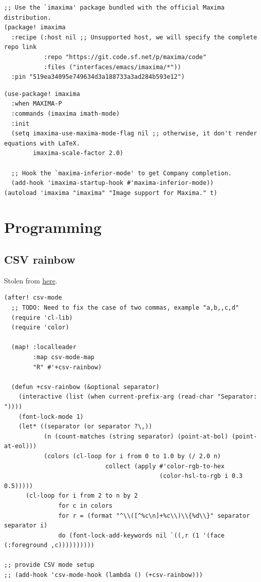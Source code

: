 \documentclass[11pt]{article}
\begin{document}
\begin{verbatim}
;; Use the `imaxima' package bundled with the official Maxima distribution.
(package! imaxima
  :recipe (:host nil ;; Unsupported host, we will specify the complete repo link
           :repo "https://git.code.sf.net/p/maxima/code"
           :files ("interfaces/emacs/imaxima/*"))
  :pin "519ea34095e749634d3a188733a3ad284b593e12")
\end{verbatim}

\begin{verbatim}
(use-package! imaxima
  :when MAXIMA-P
  :commands (imaxima imath-mode)
  :init
  (setq imaxima-use-maxima-mode-flag nil ;; otherwise, it don't render equations with LaTeX.
        imaxima-scale-factor 2.0)

  ;; Hook the `maxima-inferior-mode' to get Company completion.
  (add-hook 'imaxima-startup-hook #'maxima-inferior-mode))
(autoload 'imaxima "imaxima" "Image support for Maxima." t)
\end{verbatim}

\section{Programming}
\label{sec:orgfca1b92}
\subsection{CSV rainbow}
\label{sec:org81b9f4d}
Stolen from \href{https://www.reddit.com/r/emacs/comments/26c71k/comment/chq2r8m/?utm\_source=reddit\&utm\_medium=web2x\&context=3}{here}.

\begin{verbatim}
(after! csv-mode
  ;; TODO: Need to fix the case of two commas, example "a,b,,c,d"
  (require 'cl-lib)
  (require 'color)

  (map! :localleader
        :map csv-mode-map
        "R" #'+csv-rainbow)

  (defun +csv-rainbow (&optional separator)
    (interactive (list (when current-prefix-arg (read-char "Separator: "))))
    (font-lock-mode 1)
    (let* ((separator (or separator ?\,))
           (n (count-matches (string separator) (point-at-bol) (point-at-eol)))
           (colors (cl-loop for i from 0 to 1.0 by (/ 2.0 n)
                            collect (apply #'color-rgb-to-hex
                                           (color-hsl-to-rgb i 0.3 0.5)))))
      (cl-loop for i from 2 to n by 2
               for c in colors
               for r = (format "^\\([^%c\n]+%c\\)\\{%d\\}" separator separator i)
               do (font-lock-add-keywords nil `((,r (1 '(face (:foreground ,c))))))))))

;; provide CSV mode setup
;; (add-hook 'csv-mode-hook (lambda () (+csv-rainbow)))
\end{verbatim}
\end{document}
